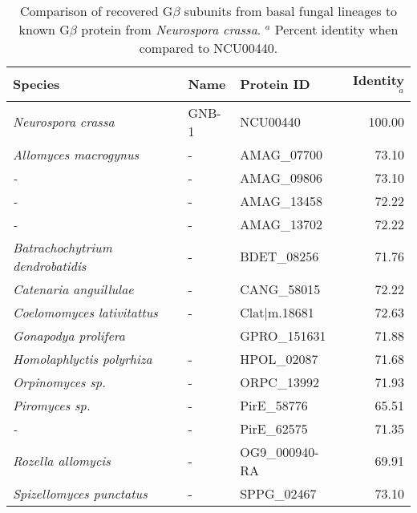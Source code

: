 \begin{table}[hp]
\caption[G$\beta$ subunit comparison.]{Comparison of recovered G$\beta$ subunits from basal fungal lineages to known G$\beta$ protein from \textit{Neurospora crassa}. $^{a}$ Percent identity when compared to NCU00440.} 
\label{tab:ChRhodA_GBcomp}
\begin{tabular}{lllr}
  \hline
Species & Name & Protein ID & Identity$^{a}$ \\ 
  \hline
\emph{Neurospora crassa} & GNB-1 & NCU00440 & 100.00 \\ 
  \emph{Allomyces macrogynus} & - & AMAG\_07700 & 73.10 \\ 
  \emph{-} & - & AMAG\_09806 & 73.10 \\ 
  \emph{-} & - & AMAG\_13458 & 72.22 \\ 
  \emph{-} & - & AMAG\_13702 & 72.22 \\ 
  \emph{Batrachochytrium dendrobatidis} & - & BDET\_08256 & 71.76 \\ 
  \emph{Catenaria anguillulae} & - & CANG\_58015 & 72.22 \\ 
  \emph{Coelomomyces lativitattus} & - & Clat|m.18681 & 72.63 \\ 
  \emph{Gonapodya prolifera} &  & GPRO\_151631 & 71.88 \\ 
  \emph{Homolaphlyctis polyrhiza} & - & HPOL\_02087 & 71.68 \\ 
  \emph{Orpinomyces sp.} & - & ORPC\_13992 & 71.93 \\ 
  \emph{Piromyces sp.} & - & PirE\_58776 & 65.51 \\ 
  \emph{-} & - & PirE\_62575 & 71.35 \\ 
  \emph{Rozella allomycis} & - & OG9\_000940-RA & 69.91 \\ 
  \emph{Spizellomyces punctatus} & - & SPPG\_02467 & 73.10 \\ 
   \hline
\end{tabular}
\end{table}
